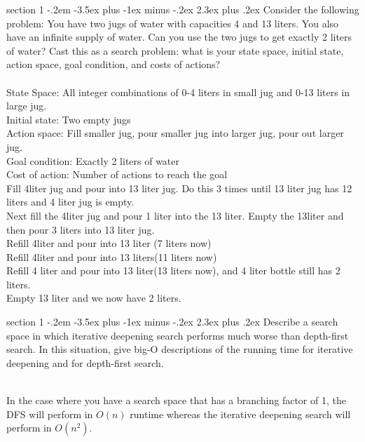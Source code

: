 \documentclass[12pt]{article}
\makeatletter
\newenvironment{problem}{\@startsection
  {section}
  {1}
  {-.2em}
  {-3.5ex plus -1ex minus -.2ex}
  {2.3ex plus .2ex}
  {
    \large\bf\noindent{Problem }
  }
}
\makeatother
\begin{document}
\begin{problem}{}
	\color{gray}
	Consider the following problem: You have two jugs of water with capacities 4 and 13 liters. You also have an infinite supply of water. Can you use the two jugs to get exactly 2 liters of water? Cast this as a search problem: what is your state space, initial state, action space, goal condition, and costs of actions?\\\\
	\color{black}
           State Space: All integer combinations of 0-4 liters in
           small jug and 0-13 liters in large jug.\\
            Initial state: Two empty jugs\\
            Action space: Fill smaller jug, pour smaller jug into
            larger jug, pour out larger jug.\\
            Goal condition: Exactly 2 liters of water\\
            Cost of action: Number of actions to reach the goal\\
            Fill 4liter jug and pour into 13 liter jug.  Do this 3
            times until 13 liter jug has 12 liters and 4 liter jug is
            empty.\\
            Next fill the 4liter jug and pour 1 liter into the 13
            liter.  Empty the 13liter and then pour 3 liters into 13
            liter jug.\\
            Refill 4liter and pour into 13 liter (7 liters now)\\
            Refill 4liter and pour into 13 liters(11 liters now)\\
            Refill 4 liter and pour into 13 liter(13 liters now), and
            4 liter bottle still has 2 liters.\\
            Empty 13 liter and we now have 2 liters.
\end{problem}

\begin{problem}{}
	\color{gray}
Describe a search space in which iterative deepening search performs much worse than depth-ﬁrst
search. In this situation, give big-O descriptions of the running time for iterative deepening and for
depth-ﬁrst search. \\ \\
	\color{black}
	
        In the case where you have a search space that has a branching
        factor of 1, the DFS will perform in $O(n)$ runtime whereas the
        iterative deepening search will perform in $O(n^2)$.
\end{problem}
\end{document}
